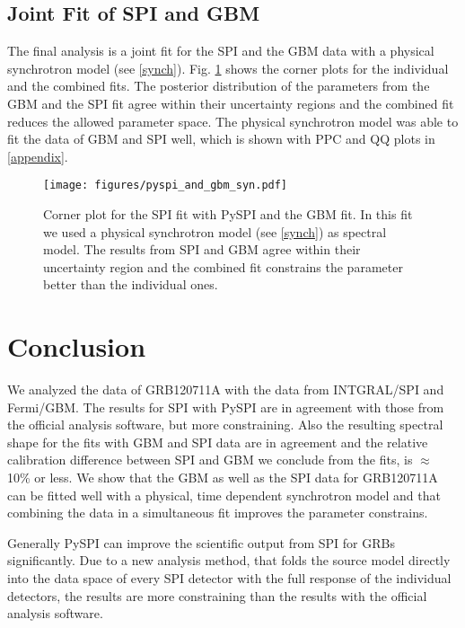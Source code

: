 \documentclass[twocolumn]{aa}
\begin{document}
\subsection{Joint Fit of SPI and GBM}

The final analysis is a joint fit for the SPI and the GBM data with a physical synchrotron model (see \ref{synch}). Fig. \ref{fig:corner_gbm_pyspi_joined_syn} shows the corner plots for the individual and the combined fits. The posterior distribution of the parameters from the GBM and the SPI fit agree within their uncertainty regions and the combined fit reduces the allowed parameter space. The physical synchrotron model was able to fit the data of GBM and SPI well, which is shown with PPC and QQ plots in \ref{appendix}.

\begin{figure}
  \begin{centering}
    \texttt{[image: figures/pyspi\_and\_gbm\_syn.pdf]}
    \caption{Corner plot for the SPI fit with PySPI and the GBM fit. In this fit we used a physical synchrotron model (see \ref{synch}) as spectral model. The results from SPI and GBM agree within their uncertainty region and the combined fit constrains the parameter better than the individual ones.}
    \label{fig:corner_gbm_pyspi_joined_syn}
  \end{centering}
\end{figure}

\section{Conclusion}

We analyzed the data of GRB120711A with the data from INTGRAL/SPI and Fermi/GBM. The results for SPI with PySPI are in agreement with those from the official analysis software, but more constraining. Also the resulting spectral shape for the fits with GBM and SPI data are in agreement and the relative calibration difference between SPI and GBM we conclude from the fits, is $\approx$ 10\% or less. We show that the GBM as well as the SPI data for GRB120711A can be fitted well with a physical, time dependent synchrotron model and that combining the data in a simultaneous fit improves the parameter constrains.

Generally PySPI can improve the scientific output from SPI for GRBs significantly. Due to a new analysis method, that folds the source model directly into the data space of every SPI detector with the full response of the individual detectors, the results are more constraining than the results with the official analysis software.
\end{document}
